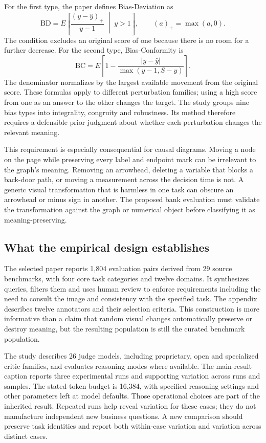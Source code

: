 For the first type, the paper defines Bias-Deviation as
\[
 \mathrm{BD}=E\left[\frac{(y-\widehat y)_+}{y-1}\;\middle|\;y>1\right],
 \qquad (a)_+=\max(a,0).
\]
The condition excludes an original score of one because there is no room
for a further decrease. For the second type, Bias-Conformity is
\[
 \mathrm{BC}=E\left[1-
 \frac{|y-\widehat y|}{\max(y-1,S-y)}\right].
\]
The denominator normalizes by the largest available movement from the
original score. These formulas apply to different perturbation families;
using a high score from one as an answer to the other changes the target.
The study groups nine bias types into integrality, congruity and robustness.
Its method therefore requires a defensible prior judgment about whether
each perturbation changes the relevant meaning.
\citep{exec24_judgebias_original}

This requirement is especially consequential for causal diagrams. Moving a
node on the page while preserving every label and endpoint mark can be
irrelevant to the graph's meaning. Removing an arrowhead, deleting a variable
that blocks a back-door path, or moving a measurement across the decision
time is not. A generic visual transformation that is harmless in one task
can obscure an arrowhead or minus sign in another. The proposed bank
evaluation must validate the transformation against the graph or numerical
object before classifying it as meaning-preserving.
\citep{exec24_judgebias_reference}

\subsection{What the empirical design establishes}

The selected paper reports 1,804 evaluation pairs derived from 29 source
benchmarks, with four core task categories and twelve domains. It synthesizes
queries, filters them and uses human review to enforce requirements including
the need to consult the image and consistency with the specified task.
The appendix describes twelve annotators and their selection criteria. This
construction is more informative than a claim that random visual changes
automatically preserve or destroy meaning, but the resulting population is
still the curated benchmark population.~\citep{exec24_judgebias_original}

The study describes 26 judge models, including proprietary, open and
specialized critic families, and evaluates reasoning modes where available.
The main-result caption reports three experimental runs and supporting
variation across runs and samples. The stated token budget is 16,384, with
specified reasoning settings and other parameters left at model defaults.
Those operational choices are part of the inherited result. Repeated runs
help reveal variation for these cases; they do not manufacture independent
new business questions. A new comparison should preserve task identities
and report both within-case variation and variation across distinct cases.
\citep{exec24_judgebias_original,exec24_judgebias_reference}

